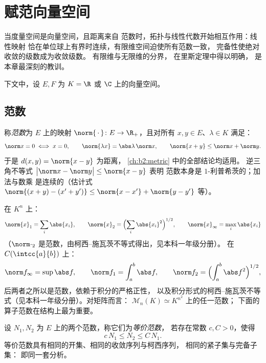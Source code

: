 \chapter{赋范向量空间}\label{ch:b2:nvs}

当度量空间是向量空间，且距离来自
范数时，拓扑与线性代数开始相互作用：线性映射
恰在单位球上有界时连续，有限维空间迫使所有范数一致，
完备性使绝对收敛的级数成为收敛级数。
有限维与无限维的分界，
在里斯定理中得以明确，
是本章最深刻的教训。

下文中，设 $E, F$ 为 $K = \R$ 或 $\C$ 上的向量空间。

\section{范数}

\begin{definition}\label{def:b2:nvs:norm}
称\emph{范数}为 $E$ 上的映射 $\norm{\,\cdot\,} \colon E
\to \R_+$，且对所有 $x, y \in E$、$\lambda \in K$ 满足：
\[
\norm x = 0 \iff x = 0,
\qquad
\norm{\lambda x} = \abs\lambda\,\norm x,
\qquad
\norm{x + y} \leq \norm x + \norm y .
\]
于是 $d(x, y) = \norm{x - y}$ 为距离，
\cref{ch:b2:metric} 中的全部结论均适用。
逆三角不等式 $\bigl|\norm x - \norm y\bigr| \leq \norm{x - y}$ 表明
范数本身是 $1$-利普希茨的；加法与数乘
是连续的（估计式 $\norm{(x + y) - (x' + y')} \leq \norm{x -
x'} + \norm{y - y'}$ 等）。
\end{definition}

\begin{example}\label{ex:b2:nvs:examples}
在 $K^n$ 上：
\[
\norm{x}_1 = \sum_i \abs{x_i},
\qquad
\norm{x}_2 = \Bigl(\sum_i \abs{x_i}^2\Bigr)^{1/2},
\qquad
\norm{x}_\infty = \max_i \abs{x_i}
\]
（$\norm\cdot_2$ 是范数，由柯西–施瓦茨不等式得出，见本科一年级分册）。
在 $C(\intcc{a}{b})$ 上：
\[
\norm f_\infty = \sup \abs f,
\qquad
\norm f_1 = \int_a^b \abs f,
\qquad
\norm f_2 = \Bigl(\int_a^b \abs f^2\Bigr)^{1/2},
\]
后两者之所以是范数，依赖于积分的严格正性，
以及积分形式的柯西–施瓦茨不等式（见本科一年级分册）。对矩阵而言：
$\mathcal M_n(K) \simeq K^{n^2}$ 上的任一范数；
下面的算子范数在结构上最为重要。
\end{example}

\begin{definition}[等价范数]\label{def:b2:nvs:equivalent}
设 $N_1, N_2$ 为 $E$ 上的两个范数，称它们为\emph{等价范数}，
若存在常数 $c, C > 0$，使得
\[
c\,N_1 \leq N_2 \leq C\, N_1 .
\]
等价范数具有相同的开集、相同的收敛序列与柯西序列，
相同的紧子集与完备子集：
即同一套分析。
\end{definition}

